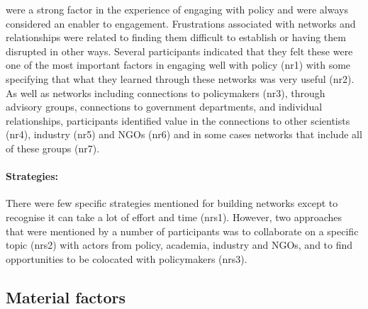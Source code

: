 \ismsnr were a strong factor in the experience of engaging with policy and were always considered an enabler to engagement. Frustrations associated with networks and relationships were related to finding them difficult to establish or having them disrupted in other ways. Several participants indicated that they felt these were one of the most important factors in engaging well with policy (nr1) with some specifying that what they learned through these networks was very useful (nr2). As well as networks including connections to policymakers (nr3), through advisory groups, connections to government departments, and individual relationships, participants identified value in the connections to other scientists (nr4), industry (nr5) and NGOs (nr6) and in some cases networks that include all of these groups (nr7).

\paragraph{Strategies:}
There were few specific strategies mentioned for building networks except to recognise it can take a lot of effort and time (nrs1). However, two approaches that were mentioned by a number of participants was to collaborate on a specific topic (nrs2) with actors from policy, academia, industry and NGOs, and to find opportunities to be colocated with policymakers (nrs3). 

\subsection{Material factors}\label{sec:resmaterial}

\subsubsection{\ismmr}\label{sec:resrules}


